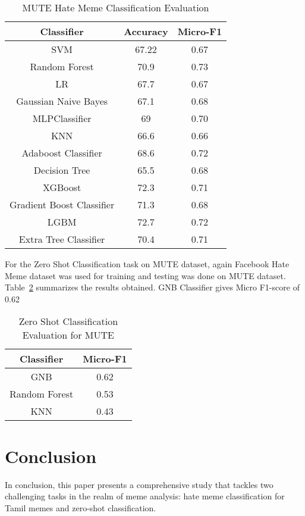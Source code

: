 \documentclass{ieeeaccess}
\begin{document}
\begin{table}[htbp]
\caption{MUTE Hate Meme Classification Evaluation}
\label{tab:mute_results}
\centering
\begin{tabular}{|c|c|c|}
\hline
\textbf{Classifier} & \textbf{Accuracy} & \textbf{Micro-F1} \\
\hline
SVM & 67.22 & 0.67 \\
Random Forest & 70.9 & 0.73 \\
LR & 67.7 & 0.67 \\
Gaussian Naive Bayes & 67.1 & 0.68 \\
MLPClassifier & 69 & 0.70 \\
KNN & 66.6 & 0.66 \\
Adaboost Classifier & 68.6 & 0.72 \\
Decision Tree & 65.5 & 0.68 \\
XGBoost & 72.3 & 0.71 \\
Gradient Boost Classifier & 71.3 & 0.68 \\
LGBM & 72.7 & 0.72 \\
Extra Tree Classifier & 70.4 & 0.71 \\
\hline
\end{tabular}
\end{table}

For the Zero Shot Classification task on MUTE dataset, again Facebook Hate Meme dataset was used for training and testing was done on MUTE dataset. Table~\ref{tab:zero_shot_mute} summarizes the results obtained. GNB Classifier gives Micro F1-score of 0.62

\begin{table}[htbp]
\caption{Zero Shot Classification Evaluation for MUTE}
\label{tab:zero_shot_mute}
\centering
\begin{tabular}{|c|c|}
\hline
\textbf{Classifier} & \textbf{Micro-F1} \\
\hline
GNB & 0.62 \\
Random Forest & 0.53 \\
KNN & 0.43 \\
\hline
\end{tabular}
\end{table}





\section{Conclusion}
\label{sec:conclusion}

In conclusion, this paper presents a comprehensive study that tackles two challenging tasks in the realm of meme analysis: hate meme classification for Tamil memes and zero-shot classification.
\end{document}
